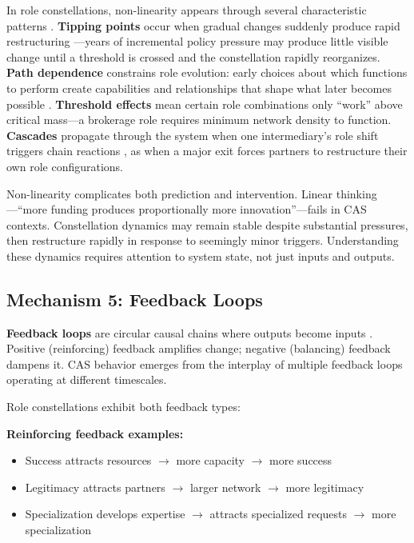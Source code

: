 \documentclass[../main.tex]{subfiles}
\begin{document}
In role constellations, non-linearity appears through several characteristic patterns \cite{sterman2000business}. \textbf{Tipping points} occur when gradual changes suddenly produce rapid restructuring \cite{scheffer2009critical}---years of incremental policy pressure may produce little visible change until a threshold is crossed and the constellation rapidly reorganizes. \textbf{Path dependence} constrains role evolution: early choices about which functions to perform create capabilities and relationships that shape what later becomes possible \cite{david1985clio}. \textbf{Threshold effects} mean certain role combinations only ``work'' above critical mass---a brokerage role requires minimum network density to function. \textbf{Cascades} propagate through the system when one intermediary's role shift triggers chain reactions \cite{watts2002simple}, as when a major exit forces partners to restructure their own role configurations.

Non-linearity complicates both prediction and intervention. Linear thinking---``more funding produces proportionally more innovation''---fails in CAS contexts. Constellation dynamics may remain stable despite substantial pressures, then restructure rapidly in response to seemingly minor triggers. Understanding these dynamics requires attention to system state, not just inputs and outputs.

\subsection{Mechanism 5: Feedback Loops}

\textbf{Feedback loops} are circular causal chains where outputs become inputs \cite{sterman2000business}. Positive (reinforcing) feedback amplifies change; negative (balancing) feedback dampens it. CAS behavior emerges from the interplay of multiple feedback loops operating at different timescales.

Role constellations exhibit both feedback types:

\textbf{Reinforcing feedback examples:}
\begin{itemize}[leftmargin=*, itemsep=0.1em]
\item Success attracts resources $\rightarrow$ more capacity $\rightarrow$ more success
\item Legitimacy attracts partners $\rightarrow$ larger network $\rightarrow$ more legitimacy
\item Specialization develops expertise $\rightarrow$ attracts specialized requests $\rightarrow$ more specialization
\end{itemize}
\end{document}
